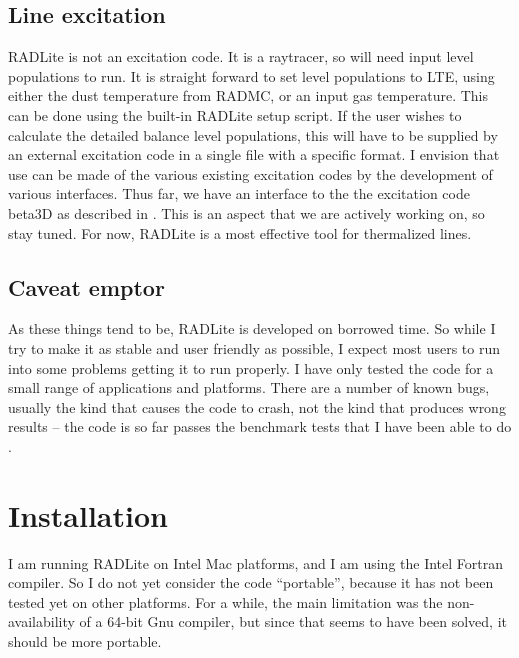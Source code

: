 \documentclass[11pt]{article}
\begin{document}
\subsection{Line excitation}

RADLite is not an excitation code. It is a raytracer, so will need input level populations to run. It is straight forward to set level populations
to LTE, using either the dust temperature from RADMC, or an input gas temperature. This can be done using the built-in RADLite setup script. If the user
wishes to calculate the detailed balance level populations, this will have to be supplied by an external excitation code in a single file with a specific format.
I envision that use can be made of the various existing excitation codes by the development of various interfaces. Thus far, we have an interface
to the the excitation code beta3D as described in \cite{Meijerink09}. This is an aspect that we are actively working on, so stay tuned. For now, RADLite is a most
effective tool for thermalized lines. 

\subsection{Caveat emptor}

As these things tend to be, RADLite is developed on borrowed time. So while I try to make it as stable and
user friendly as possible, I expect most users to run into some problems getting it to run properly. I have
only tested the code for a small range of applications and platforms. There are 
a number of known bugs, usually the kind that causes the code to crash, not the kind
that produces wrong results -- the code is so far passes the benchmark tests
that I have been able to do \citep[more details in ][]{Pontoppidan09}. 

\section{Installation}

I am running RADLite on Intel Mac platforms, and I am using the Intel Fortran compiler. So I do not
yet consider the code ``portable'', because it has not been tested yet on other platforms. For a 
while, the main limitation was the non-availability of a 64-bit Gnu compiler, but since that seems to
have been solved, it should be more portable. 
\end{document}
